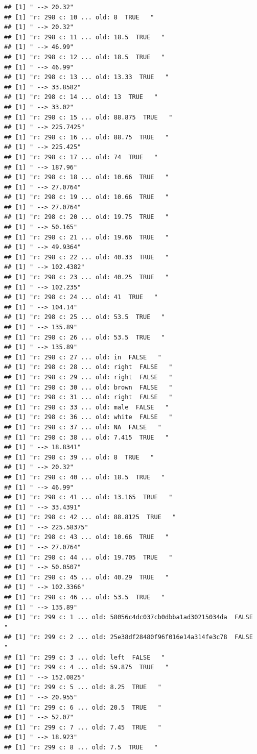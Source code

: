 \documentclass[]{article}
\begin{document}
\begin{verbatim}
## [1] " --> 20.32"
## [1] "r: 298 c: 10 ... old: 8  TRUE   "
## [1] " --> 20.32"
## [1] "r: 298 c: 11 ... old: 18.5  TRUE   "
## [1] " --> 46.99"
## [1] "r: 298 c: 12 ... old: 18.5  TRUE   "
## [1] " --> 46.99"
## [1] "r: 298 c: 13 ... old: 13.33  TRUE   "
## [1] " --> 33.8582"
## [1] "r: 298 c: 14 ... old: 13  TRUE   "
## [1] " --> 33.02"
## [1] "r: 298 c: 15 ... old: 88.875  TRUE   "
## [1] " --> 225.7425"
## [1] "r: 298 c: 16 ... old: 88.75  TRUE   "
## [1] " --> 225.425"
## [1] "r: 298 c: 17 ... old: 74  TRUE   "
## [1] " --> 187.96"
## [1] "r: 298 c: 18 ... old: 10.66  TRUE   "
## [1] " --> 27.0764"
## [1] "r: 298 c: 19 ... old: 10.66  TRUE   "
## [1] " --> 27.0764"
## [1] "r: 298 c: 20 ... old: 19.75  TRUE   "
## [1] " --> 50.165"
## [1] "r: 298 c: 21 ... old: 19.66  TRUE   "
## [1] " --> 49.9364"
## [1] "r: 298 c: 22 ... old: 40.33  TRUE   "
## [1] " --> 102.4382"
## [1] "r: 298 c: 23 ... old: 40.25  TRUE   "
## [1] " --> 102.235"
## [1] "r: 298 c: 24 ... old: 41  TRUE   "
## [1] " --> 104.14"
## [1] "r: 298 c: 25 ... old: 53.5  TRUE   "
## [1] " --> 135.89"
## [1] "r: 298 c: 26 ... old: 53.5  TRUE   "
## [1] " --> 135.89"
## [1] "r: 298 c: 27 ... old: in  FALSE   "
## [1] "r: 298 c: 28 ... old: right  FALSE   "
## [1] "r: 298 c: 29 ... old: right  FALSE   "
## [1] "r: 298 c: 30 ... old: brown  FALSE   "
## [1] "r: 298 c: 31 ... old: right  FALSE   "
## [1] "r: 298 c: 33 ... old: male  FALSE   "
## [1] "r: 298 c: 36 ... old: white  FALSE   "
## [1] "r: 298 c: 37 ... old: NA  FALSE   "
## [1] "r: 298 c: 38 ... old: 7.415  TRUE   "
## [1] " --> 18.8341"
## [1] "r: 298 c: 39 ... old: 8  TRUE   "
## [1] " --> 20.32"
## [1] "r: 298 c: 40 ... old: 18.5  TRUE   "
## [1] " --> 46.99"
## [1] "r: 298 c: 41 ... old: 13.165  TRUE   "
## [1] " --> 33.4391"
## [1] "r: 298 c: 42 ... old: 88.8125  TRUE   "
## [1] " --> 225.58375"
## [1] "r: 298 c: 43 ... old: 10.66  TRUE   "
## [1] " --> 27.0764"
## [1] "r: 298 c: 44 ... old: 19.705  TRUE   "
## [1] " --> 50.0507"
## [1] "r: 298 c: 45 ... old: 40.29  TRUE   "
## [1] " --> 102.3366"
## [1] "r: 298 c: 46 ... old: 53.5  TRUE   "
## [1] " --> 135.89"
## [1] "r: 299 c: 1 ... old: 58056c4dc037cb0dbba1ad30215034da  FALSE   "
## [1] "r: 299 c: 2 ... old: 25e38df28480f96f016e14a314fe3c78  FALSE   "
## [1] "r: 299 c: 3 ... old: left  FALSE   "
## [1] "r: 299 c: 4 ... old: 59.875  TRUE   "
## [1] " --> 152.0825"
## [1] "r: 299 c: 5 ... old: 8.25  TRUE   "
## [1] " --> 20.955"
## [1] "r: 299 c: 6 ... old: 20.5  TRUE   "
## [1] " --> 52.07"
## [1] "r: 299 c: 7 ... old: 7.45  TRUE   "
## [1] " --> 18.923"
## [1] "r: 299 c: 8 ... old: 7.5  TRUE   "

\end{verbatim}
\end{document}
